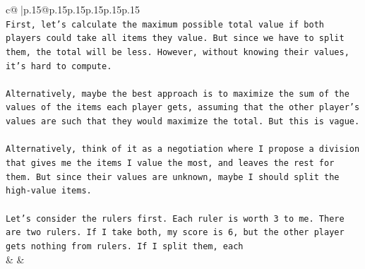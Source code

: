 \documentclass{article}
\begin{document}
{\begin{supertabular}{c@{$\;$}|p{.15\linewidth}@{}p{.15\linewidth}p{.15\linewidth}p{.15\linewidth}p{.15\linewidth}p{.15\linewidth}}
{{{\\ 
\texttt{First, let's calculate the maximum possible total value if both players could take all items they value. But since we have to split them, the total will be less. However, without knowing their values, it's hard to compute.} \\
\\ 
\texttt{Alternatively, maybe the best approach is to maximize the sum of the values of the items each player gets, assuming that the other player's values are such that they would maximize the total. But this is vague.} \\
\\ 
\texttt{Alternatively, think of it as a negotiation where I propose a division that gives me the items I value the most, and leaves the rest for them. But since their values are unknown, maybe I should split the high{-}value items.} \\
\\ 
\texttt{Let's consider the rulers first. Each ruler is worth 3 to me. There are two rulers. If I take both, my score is 6, but the other player gets nothing from rulers. If I split them, each} \\
            }
        }
    }
    & & \\ \\


\end{supertabular}}
\end{document}
